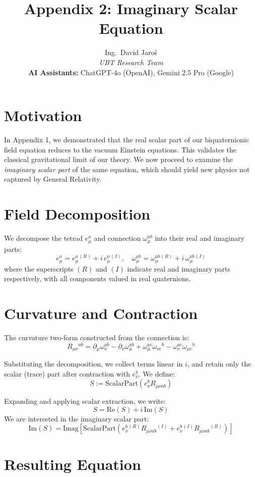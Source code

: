 \documentclass[12pt]{article}
\title{Appendix 2: Imaginary Scalar Equation}
\author{
Ing.~David Jaroš \\
\textit{UBT Research Team} \\
\textbf{AI Assistants:} ChatGPT-4o (OpenAI), Gemini 2.5 Pro (Google) \\
}
\date{}
\begin{document}
\maketitle

\section*{Motivation}

In Appendix 1, we demonstrated that the real scalar part of our biquaternionic field equation reduces to the vacuum Einstein equations. This validates the classical gravitational limit of our theory. We now proceed to examine the \emph{imaginary scalar part} of the same equation, which should yield new physics not captured by General Relativity.

\section*{Field Decomposition}

We decompose the tetrad $e^a_\mu$ and connection $\omega_\mu^{ab}$ into their real and imaginary parts:
\[
e^a_\mu = e^a_\mu{}^{(R)} + i\,e^a_\mu{}^{(I)}, \quad
\omega_\mu^{ab} = \omega_\mu^{ab}{}^{(R)} + i\,\omega_\mu^{ab}{}^{(I)}
\]
where the superscripts $(R)$ and $(I)$ indicate real and imaginary parts respectively, with all components valued in real quaternions.

\section*{Curvature and Contraction}

The curvature two-form constructed from the connection is:
\[
R_{\mu\nu}{}^{ab} = \partial_\mu \omega_\nu^{ab} - \partial_\nu \omega_\mu^{ab} + \omega_\mu^{ac} \omega_{\nu c}{}^b - \omega_\nu^{ac} \omega_{\mu c}{}^b
\]

Substituting the decomposition, we collect terms linear in $i$, and retain only the scalar (trace) part after contraction with $e^b_\nu$. We define:
\[
S := \text{ScalarPart} \left( e^b_\nu R_{\mu\nu ab} \right)
\]

Expanding and applying scalar extraction, we write:
\[
S = \text{Re}(S) + i\,\text{Im}(S)
\]
We are interested in the imaginary scalar part:
\[
\text{Im}(S) = \text{Imag} \left[ \text{ScalarPart} \left( e^b_\nu{}^{(R)} R_{\mu\nu ab}{}^{(I)} + e^b_\nu{}^{(I)} R_{\mu\nu ab}{}^{(R)} \right) \right]
\]

\section*{Resulting Equation}
\end{document}
